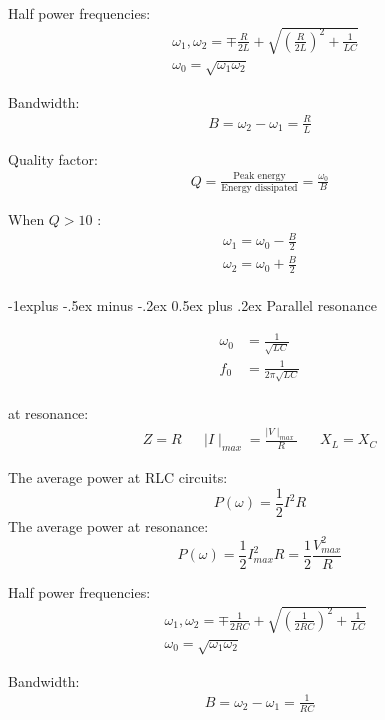 \documentclass[a4paper]{article}
\makeatletter
\renewcommand{\subsection}{\@startsection{subsection}{2}{0mm}%
                                {-1explus -.5ex minus -.2ex}%
                                {0.5ex plus .2ex}%
                                {\normalfont\normalsize\bfseries}}
\makeatother
\begin{document}
\begin{multicols}{3}
Half power frequencies:
\begin{align*}
&\omega_1 , \omega_2 = \mp \frac{R}{2L} + \sqrt{\left( \frac{R}{2L} \right)^2  + \frac{1}{LC} }\\
&\omega_0 = \sqrt{\omega_1 \omega_2}
\end{align*}

Bandwidth:
\begin{align*}
B = \omega_2 - \omega_1 = \frac{R}{L}
\end{align*}

Quality factor:
\begin{align*}
Q = \frac{\text{Peak energy}}{\text{Energy dissipated}} = \frac{\omega_0}{B}
\end{align*}

When $Q>10$ :
\begin{align*}
\omega_1 = \omega_0 - \frac{B}{2}\\
\omega_2 = \omega_0 + \frac{B}{2}\\
\end{align*}

\subsection{Parallel resonance}

\begin{align*}
\omega_0 &= \frac{1}{\sqrt{LC}}\\
f_0 &= \frac{1}{2\pi \sqrt{LC}}\\
\end{align*}

at resonance:
\begin{align*}
Z=R &&\mid I \mid_{max} = \frac{\mid V \mid_{max}}{R} &&X_L=X_C
\end{align*}

The average power at RLC circuits:
$$P(\omega) = \frac{1}{2} I^2 R$$
The average power at resonance: 
$$P(\omega) = \frac{1}{2} I_{max}^2 R = \frac{1}{2} \frac{V_{max}^2}{R}$$

Half power frequencies:
\begin{align*}
&\omega_1 , \omega_2 = \mp \frac{1}{2RC} + \sqrt{\left( \frac{1}{2RC} \right)^2  + \frac{1}{LC} }\\
&\omega_0 = \sqrt{\omega_1 \omega_2}
\end{align*}

Bandwidth:
\begin{align*}
B = \omega_2 - \omega_1 = \frac{1}{RC}
\end{align*}


\end{multicols}
\end{document}
